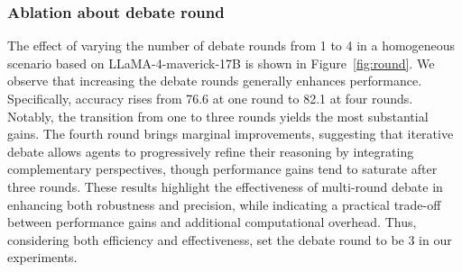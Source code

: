 \documentclass[letterpaper]{article} %
\begin{document}

\begin{table}[h]
\centering 
\caption{
Ablation study about history. "homo" and "hete" mean homogeneous and heterogeneous, respectively.
}
\label{ab_3}
\vspace{-5mm}
\end{table}




\subsubsection{Ablation about debate round}

The effect of varying the number of debate rounds from 1 to 4 in a homogeneous scenario based on LLaMA-4-maverick-17B is shown in Figure~\ref{fig:round}. 
We observe that increasing the debate rounds generally enhances performance. Specifically, accuracy rises from 76.6 at one round to 82.1 at four rounds. Notably, the transition from one to three rounds yields the most substantial gains. The fourth round brings marginal improvements, suggesting that iterative debate allows agents to progressively refine their reasoning by integrating complementary perspectives, though performance gains tend to saturate after three rounds. These results highlight the effectiveness of multi-round debate in enhancing both robustness and precision, while indicating a practical trade-off between performance gains and additional computational overhead. Thus, considering both efficiency and effectiveness, set the debate round to be 3 in our experiments.
\end{document}
